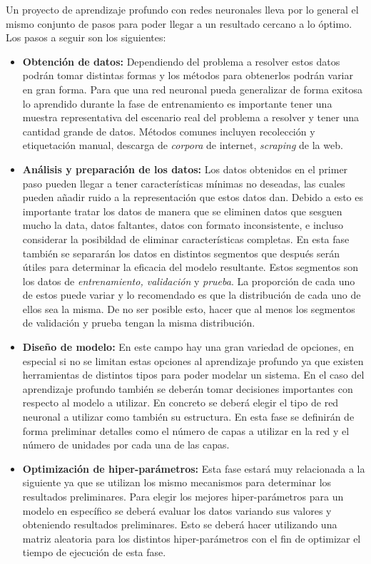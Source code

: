 Un proyecto de aprendizaje profundo con redes neuronales lleva por lo general el mismo conjunto de pasos para poder llegar a un resultado cercano a lo óptimo. Los pasos a seguir son los siguientes:

\begin{itemize}
\item \textbf{Obtención de datos:} Dependiendo del problema a resolver estos datos podrán tomar distintas formas y los métodos para obtenerlos podrán variar en gran forma. Para que una red neuronal pueda generalizar de forma exitosa lo aprendido durante la fase de entrenamiento es importante tener una muestra representativa del escenario real del problema a resolver y tener una cantidad grande de datos. Métodos comunes incluyen recolección y etiquetación manual, descarga de \textit{corpora} de internet, \textit{scraping} de la web.

\item \textbf{Análisis y preparación de los datos:} Los datos obtenidos en el primer paso pueden llegar a tener características mínimas no deseadas, las cuales pueden añadir ruido a la representación que estos datos dan. Debido a esto es importante tratar los datos de manera que se eliminen datos que sesguen mucho la data, datos faltantes, datos con formato inconsistente, e incluso considerar la posibildad de eliminar características completas. En esta fase también se separarán los datos en distintos segmentos que después serán útiles para determinar la eficacia del modelo resultante. Estos segmentos son los datos de \textit{entrenamiento, validación} y \textit{prueba}. La proporción de cada uno de estos puede variar y lo recomendado es que la distribución de cada uno de ellos sea la misma. De no ser posible esto, hacer que al menos los segmentos de validación y prueba tengan la misma distribución.

\item \textbf{Diseño de modelo:} En este campo hay una gran variedad de opciones, en especial si no se limitan estas opciones al aprendizaje profundo ya que existen herramientas de distintos tipos para poder modelar un sistema. En el caso del aprendizaje profundo también se deberán tomar decisiones importantes con respecto al modelo a utilizar. En concreto se deberá elegir el tipo de red neuronal a utilizar como también su estructura. En esta fase se definirán de forma preliminar detalles como el número de capas a utilizar en la red y el número de unidades por cada una de las capas.

\item \textbf{Optimización de hiper-parámetros:} Esta fase estará muy relacionada a la siguiente ya que se utilizan los mismo mecanismos para determinar los resultados preliminares. Para elegir los mejores hiper-parámetros para un modelo en específico se deberá evaluar los datos variando sus valores y obteniendo resultados preliminares. Esto se deberá hacer utilizando una matriz aleatoria para los distintos hiper-parámetros con el fin de optimizar el tiempo de ejecución de esta fase.


\end{itemize}
